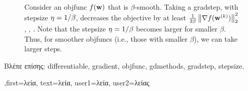 {{\begin{figure}[H]
\begin{center}
	    	\end{center}
	    	\caption{Consider an \gls{objfunc} $f({\bf w})$ that is $\beta$-smooth. 
	    		Taking a \gls{gradstep}, with \gls{stepsize} $\eta = 1/\beta$, decreases the 
	    		objective by at least $\frac{1}{2\beta}\left\Vert {\nabla f({\bf w}^{(k)})} \right\Vert_{2}^{2}$ \cite{nesterov04}, \cite{CvxBubeck2015}, \cite{CvxAlgBertsekas}. 
	    		Note that the \gls{stepsize} $\eta = 1/\beta$ becomes larger for smaller $\beta$. Thus, 
	    		for smoother \gls{objfunc}s (i.e., those with smaller $\beta$), 
				we can take larger steps. \label{fig_gd_smooth_dict}}
	    	\end{figure}
		\foreignlanguage{greek}{Βλέπε επίσης:} \gls{differentiable}, \gls{gradient}, \gls{objfunc}, \gls{gdmethods}, \gls{gradstep}, \gls{stepsize}.
	    },first={\foreignlanguage{greek}{λεία}},
	    text={\foreignlanguage{greek}{λεία}},
	    user1={\foreignlanguage{greek}{λεία}}, %
	    user2={\foreignlanguage{greek}{λείας}} %
}

